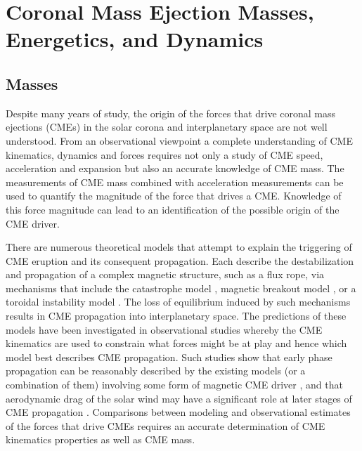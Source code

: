 

\chapter{Coronal Mass Ejection Masses, Energetics, and Dynamics} 
\label{chap:4}


\section{Masses}\label{sec:1}

Despite many years of study, the origin of the forces that drive coronal mass ejections (CMEs) in the solar corona and interplanetary space are not 
well understood. 
From an observational viewpoint a complete understanding of CME kinematics, dynamics and forces requires not only a study of CME speed, 
acceleration and expansion but also an accurate knowledge of CME mass.  The measurements of CME mass combined with acceleration 
measurements can be used to quantify the magnitude of the force that drives a CME. Knowledge of this force magnitude can lead to an 
identification of the possible origin of the CME driver. 

There are numerous theoretical models that attempt to explain the triggering of CME eruption and its consequent propagation. Each describe the 
destabilization and propagation of a complex magnetic structure, such as a flux rope, via mechanisms that include the catastrophe model \citep
{forbes1991,forbes1995,lin2000}, magnetic breakout model \citep{antio99,lynch2008}, or a toroidal instability model \citep{chen1996,kleim2006}. 
The loss of equilibrium induced by such mechanisms results in CME propagation into interplanetary space. The predictions of these models have 
been investigated in observational studies whereby the CME kinematics are used to constrain what forces might be at play and hence which model 
best describes CME propagation. Such studies show that early phase propagation can be reasonably described by the existing models (or a 
combination of them) involving some form of magnetic CME driver \citep{manoh2003, chen2006, Schrij2008, lin2010}, and that aerodynamic drag 
of the solar wind may have a significant role at later stages of CME propagation \citep{howard2007, malo10, byr10}. Comparisons between 
modeling and observational estimates of the forces that drive CMEs requires an accurate determination of CME kinematics properties as well as 
CME mass.

